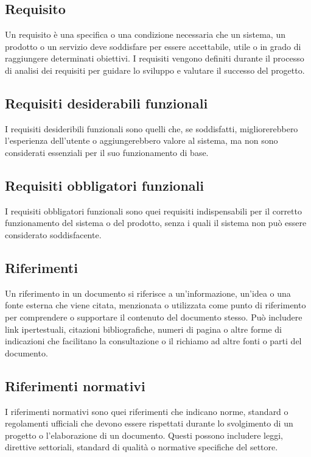 \subsection*{Requisito} 
Un requisito è una specifica o una condizione necessaria che un sistema, un prodotto o un servizio deve soddisfare per essere accettabile, utile o in grado di raggiungere determinati obiettivi. I requisiti vengono definiti durante il processo di analisi dei requisiti per guidare lo sviluppo e valutare il successo del progetto. 
\subsection*{Requisiti desiderabili funzionali} 
I requisiti desideribili funzionali sono quelli che, se soddisfatti, migliorerebbero l'esperienza dell'utente o aggiungerebbero valore al sistema, ma non sono considerati essenziali per il suo funzionamento di base. 
\subsection*{Requisiti obbligatori funzionali} 
I requisiti obbligatori funzionali sono quei requisiti indispensabili per il corretto funzionamento del sistema o del prodotto, senza i quali il sistema non può essere considerato soddisfacente. 
\subsection*{Riferimenti} 
Un riferimento in un documento si riferisce a un'informazione, un'idea o una fonte esterna che viene citata, menzionata o utilizzata come punto di riferimento per comprendere o supportare il contenuto del documento stesso. Può includere link ipertestuali, citazioni bibliografiche, numeri di pagina o altre forme di indicazioni che facilitano la consultazione o il richiamo ad altre fonti o parti del documento. 
\subsection*{Riferimenti normativi} 
I riferimenti normativi sono quei riferimenti che indicano norme, standard o regolamenti ufficiali che devono essere rispettati durante lo svolgimento di un progetto o l'elaborazione di un documento. Questi possono includere leggi, direttive settoriali, standard di qualità o normative specifiche del settore.
